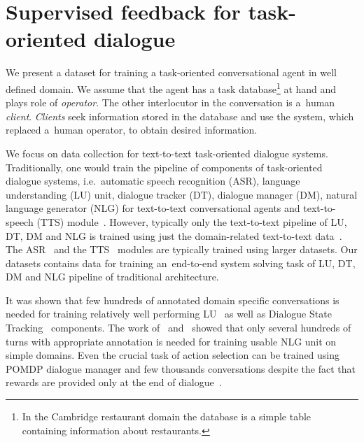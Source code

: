 \documentclass[runningheads,a4paper]{llncs}
\def\OD#1{{\color{darkgreen}OD: \it #1}}
\begin{document}

\section{Supervised feedback for task-oriented dialogue} \label{sec:repre}
\vspace{-0.50em}
We present a dataset for training a task-oriented conversational agent in well defined domain.
We assume that the agent has a task database\footnote{In the Cambridge restaurant domain the database is a simple table containing information about restaurants.} at hand and plays role of {\it operator}.
The other interlocutor in the conversation is a~human {\it client}.
{\it Clients} seek information stored in the database and use the system, which replaced a~human operator, to obtain desired information.

We focus on data collection for text-to-text task-oriented dialogue systems.
Traditionally, one would train the pipeline of components of task-oriented dialogue systems, i.e.\ automatic speech recognition (ASR), language understanding (LU) unit, dialogue tracker (DT), dialogue manager (DM), natural language generator (NLG) for text-to-text conversational agents and text-to-speech (TTS) module~\cite{duvsek2014alex}.
However, typically only the text-to-text pipeline of LU, DT, DM and NLG is trained using just the domain-related text-to-text data~\cite{gasic2011line,jurvcivcek2014factored,duvsek2016sequence}.
The ASR~\cite{platek2014free} and the TTS~\cite{taylor2009text} modules are typically trained using larger datasets.
Our datasets contains data for training an~end-to-end system solving task of LU, DT, DM and NLG pipeline of traditional architecture.

It was shown that few hundreds of annotated domain specific conversations is needed for training relatively well performing LU~\cite{jurvcivcek2014factored} as well as Dialogue State Tracking~\cite{young2010hidden} components.
The work of~\cite{duvsek2016sequence} and~\cite{mairesse2010phrase} showed that only several hundreds of turns with appropriate annotation is needed for training usable NLG unit on simple domains.
Even the crucial task of action selection can be trained using POMDP dialogue manager and few thousands conversations despite the fact that rewards are provided only at the end of dialogue~\cite{gasic2011line}.
\end{document}
